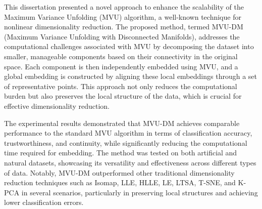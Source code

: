 \label{chap:Conclusion}


This dissertation presented a novel approach to enhance the scalability of the Maximum Variance Unfolding (MVU) algorithm, a well-known technique for nonlinear dimensionality reduction. The proposed method, termed MVU-DM (Maximum Variance Unfolding with Disconnected Manifolds), addresses the computational challenges associated with MVU by decomposing the dataset into smaller, manageable components based on their connectivity in the original space. Each component is then independently embedded using MVU, and a global embedding is constructed by aligning these local embeddings through a set of representative points. This approach not only reduces the computational burden but also preserves the local structure of the data, which is crucial for effective dimensionality reduction.

The experimental results demonstrated that MVU-DM achieves comparable performance to the standard MVU algorithm in terms of classification accuracy, trustworthiness, and continuity, while significantly reducing the computational time required for embedding. The method was tested on both artificial and natural datasets, showcasing its versatility and effectiveness across different types of data. Notably, MVU-DM outperformed other traditional dimensionality reduction techniques such as Isomap, LLE, HLLE, LE, LTSA, T-SNE, and K-PCA in several scenarios, particularly in preserving local structures and achieving lower classification errors.

